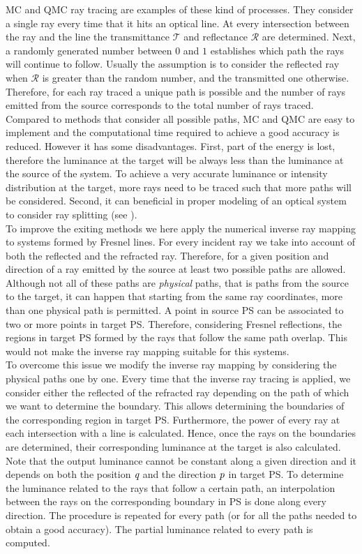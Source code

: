 MC and QMC ray tracing are examples of these kind of processes. They consider a single ray every time that it hits an optical line. At every intersection between the ray and the line the transmittance $\mathcal{T}$ and reflectance $\mathcal{R}$ are determined. Next, a randomly generated number between $0$ and $1$ establishes which path the rays will continue to follow. Usually the assumption is to consider the reflected ray when $\mathcal{R}$ is greater than the random number, and the transmitted one otherwise. Therefore, for each ray traced a unique path is possible and the number of rays emitted from the source corresponds to the total number of rays traced. Compared to methods that consider all possible paths, MC and QMC are easy to implement and the computational time required to achieve a good accuracy is reduced. However it has some disadvantages. First, part of the energy is lost, therefore the luminance at the target will be always less than the luminance at the source of the system. To achieve a very accurate luminance or intensity distribution at the target, more rays need to be traced such that more paths will be considered.
Second, it can beneficial in proper modeling of an optical system to consider ray splitting (see \cite{koshel2012illumination}).
\\ \indent 
To improve the exiting methods we here apply the numerical inverse ray mapping to systems formed by Fresnel lines. For every incident ray we take into account of both the reflected and the refracted ray. Therefore, for a given position and direction of a ray emitted by the source at least two possible paths are allowed. Although not all of these paths are \textit{physical} paths, that is paths from the source to the target, it can happen that starting from the same ray coordinates, more than one physical path is permitted. A point in source PS can be associated to two or more points in target PS. Therefore, considering Fresnel reflections, the regions in target PS formed by the rays that follow the same path overlap. This would not make the inverse ray mapping suitable for this systems.
\\ \indent To overcome this issue we modify the inverse ray mapping by considering the physical paths one by one. Every time that the inverse ray tracing is applied, we consider either the reflected of the refracted ray depending on the path of which we want to determine the boundary. This allows determining the boundaries of the corresponding region in target PS. Furthermore, the power of every ray at each intersection with a line is calculated. Hence, once the rays on the boundaries are determined, their corresponding luminance at the target is also calculated. Note that the output luminance cannot be constant along a given direction and it depends on both the position $\textit{q}$ and the direction $\textit{p}$ in target PS. To determine the luminance related to the rays that follow a certain path, an interpolation between the rays on the corresponding boundary in PS is done along every direction. The procedure is repeated for every path (or for all the paths needed to obtain a good accuracy). The partial luminance related to every path is computed.
